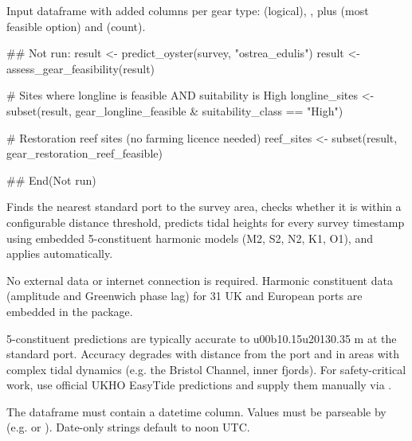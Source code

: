 \documentclass[a4paper]{book}
\begin{document}
%
\begin{Value}
Input dataframe with added columns per gear type:
 (logical),
 ,
plus  (most feasible option) and  (count).
\end{Value}
%
\begin{Examples}
\begin{ExampleCode}
## Not run: 
result <- predict_oyster(survey, "ostrea_edulis")
result <- assess_gear_feasibility(result)

# Sites where longline is feasible AND suitability is High
longline_sites <- subset(result,
  gear_longline_feasible & suitability_class == "High")

# Restoration reef sites (no farming licence needed)
reef_sites <- subset(result, gear_restoration_reef_feasible)

## End(Not run)
\end{ExampleCode}
\end{Examples}
%
\begin{Description}
Finds the nearest standard port to the survey area, checks whether it is
within a configurable distance threshold, predicts tidal heights for every
survey timestamp using embedded 5-constituent harmonic models
(M2, S2, N2, K1, O1), and applies  automatically.

No external data or internet connection is required. Harmonic constituent
data (amplitude and Greenwich phase lag) for 31 UK and European ports are
embedded in the package.

 5-constituent predictions are typically accurate to \bsl{}u00b10.15\bsl{}u20130.35 m
at the standard port. Accuracy degrades with distance from the port and in
areas with complex tidal dynamics (e.g. the Bristol Channel, inner fjords).
For safety-critical work, use official UKHO EasyTide predictions and supply
them manually via .

 The dataframe must contain a datetime column. Values must
be parseable by  (e.g.  or
). Date-only strings default to noon UTC.
\end{Description}
\end{document}
